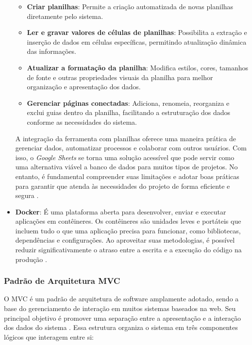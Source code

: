 \begin{itemize}
    \begin{itemize}
        \item \textbf{Criar planilhas}: Permite a criação automatizada de novas planilhas diretamente pelo sistema.
        \item \textbf{Ler e gravar valores de células de planilhas}: Possibilita a extração e inserção de dados em células específicas, permitindo atualização dinâmica das informações.
        \item \textbf{Atualizar a formatação da planilha}: Modifica estilos, cores, tamanhos de fonte e outras propriedades visuais da planilha para melhor organização e apresentação dos dados.
        \item \textbf{Gerenciar páginas conectadas}: Adiciona, renomeia, reorganiza e exclui guias dentro da planilha, facilitando a estruturação dos dados conforme as necessidades do sistema.
    \end{itemize}

    A integração da ferramenta com planilhas oferece uma maneira prática de gerenciar dados, automatizar processos e colaborar com outros usuários. Com isso, o \textit{Google Sheets} se torna uma solução acessível que pode servir como uma alternativa viável a banco de dados para muitos tipos de projetos. No entanto, é fundamental compreender suas limitações e adotar boas práticas para garantir que atenda às necessidades do projeto de forma eficiente e segura \cite{ufsm2024}.
    
    \item \textbf{Docker}: É uma plataforma aberta para desenvolver, enviar e executar aplicações em contêineres. Os contêineres são unidades leves e portáteis que incluem tudo o que uma aplicação precisa para funcionar, como bibliotecas, dependências e configurações. Ao aproveitar suas metodologias, é possível reduzir significativamente o atraso entre a escrita e a execução do código na produção \cite{docker2025}.
\end{itemize}

\subsubsection{Padrão de Arquitetura MVC}

O MVC é um padrão de arquitetura de software amplamente adotado, sendo a base do gerenciamento de interação em muitos sistemas baseados na web. Seu principal objetivo é promover uma separação entre a apresentação e a interação dos dados do sistema \cite{sommerville2011engenharia}. Essa estrutura organiza o sistema em três componentes lógicos que interagem entre si:

